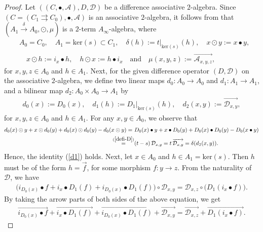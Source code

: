 \documentclass[a4paper,reqno,10pt]{amsart}
\theoremstyle{plain}
\theoremstyle{definition}
\theoremstyle{remark}
\begin{document}
\begin{proof}
Let $((C, \bullet, \mathcal{A}), D, \mathcal{D})$ be a difference associative $2$-algebra. Since $(C = (C_1 \rightrightarrows C_0), \bullet, \mathcal{A})$ is an associative $2$-algebra, it follows from \cite{das-hom,kh} that $(A_1 \xrightarrow{\delta} A_0, \odot, \mu)$ is a $2$-term $A_\infty$-algebra, where
\begin{align}
   & A_0 = C_0, \quad A_1 = \mathrm{ker} (s) \subset C_1, \quad \delta (h) := t |_{\mathrm{ker}(s)} (h), \quad x \odot y := x \bullet y, \nonumber\\
   & \quad  x \odot h := i_x \bullet h, \quad h \odot x := h \bullet i_x ~~~ \text{ and } ~~~ \mu(x, y, z) := \overrightarrow{\mathcal{A}_{x, y, z}}, \label{some1}
\end{align}
for $x, y, z \in A_0$ and $h \in A_1$. Next, for the given difference operator $(D, \mathcal{D})$ on the associative $2$-algebra, we define two linear maps $d_0 : A_0 \rightarrow A_0$ and $d_1 : A_1 \rightarrow A_1$, and a bilinear map $d_2 : A_0 \times A_0 \rightarrow A_1$ by
\begin{align}
    d_0 (x) := D_0 (x), \quad d_1 (h) := D_1 |_{\mathrm{ker}(s)}  (h), \quad d_2 (x, y) := \overrightarrow{ \mathcal{D}_{x, y}}, \label{some2}
\end{align}
for $x, y, z \in A_0$ and $h \in A_1$. For any $x, y \in A_0$, we observe that 
\begin{align*}
    d_0 (x) \odot y + x \odot d_0 (y) + d_0 (x) \odot d_0 (y) - d_0 (x \odot y ) =~& D_0 (x) \bullet y + x \bullet D_0 (y) + D_0 (x) \bullet D_0 (y) - D_0 (x \bullet y) \\
    \stackrel{(\ref{defi-D})}{=}& (t-s) ~ \! \mathcal{D}_{x, y} = t ~ \! \overrightarrow{\mathcal{D}_{x, y}} = \delta (d_2 (x, y)).
\end{align*}
Hence, the identity (\ref{d1}) holds. Next, let $x \in A_0$ and $h \in A_1 = \mathrm{ker}(s)$. Then $h$ must be of the form $h = \overrightarrow{f}$, for some morphism $f : y \rightarrow z$. From the naturality of $\mathcal{D}$, we have
\begin{align*}
    \big( i_{D_0 (x)} \bullet f + i_x \bullet D_1 (f) + i_{D_0 (x)} \bullet D_1 (f)     \big) \circ \mathcal{D}_{x, y} = \mathcal{D}_{x, z} \circ \big( D_1 (i_x \bullet f)    \big).
\end{align*}
By taking the arrow parts of both sides of the above equation, we get
\begin{align*}
    \overrightarrow{ i_{D_0 (x)} \bullet f } + \overrightarrow{ i_x \bullet D_1 (f)} + \overrightarrow{ i_{D_0 (x)} \bullet D_1 (f)  } + \overrightarrow{ \mathcal{D}_{x, y}} = \overrightarrow{  \mathcal{D}_{x, z}} + \overrightarrow{ D_1 (i_x \bullet f)   }.

\end{align*}
\end{proof}
\end{document}
